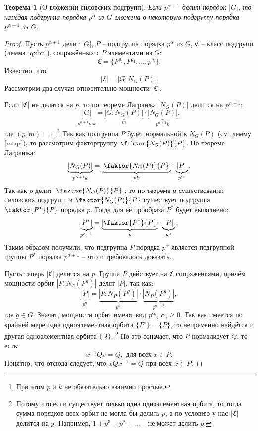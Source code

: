 \documentclass{article}
\newtheorem{theorem}{Теорема}[section]
\begin{document}
\begin{theorem}[О вложении силовских подгрупп]
    Если $p^{\alpha + 1}$ делит порядок $|G|$, то каждая подгруппа порядка $p^\alpha$ из $G$ вложена в некоторую подгруппу порядка $p^{\alpha + 1}$ из $G$.
\end{theorem}
\begin{proof}
    Пусть $p^{\alpha + 1}$ делит $|G|$, $P$ -- подгруппа порядка $p^\alpha$ из $G$, $\mathfrak{C}$ -- класс подгрупп (лемма \ref{qxbn}), сопряжённых с $P$ элементами из $G$: $$ \mathfrak{C} = \{P^{g_1}, P^{g_2}, \ldots, p^{g_s} \}. $$ Известно, что $$|\mathfrak{C}| = | G : N_G(P) |. $$ Рассмотрим два случая относительно мощности $|\mathfrak{C}|$.

    Если $|\mathfrak{C}|$ не делится на $p$, то по теореме Лагранжа $|N_G(P)|$ делится на $p^{\alpha + 1}$: $$ \underbrace{|G|}_{p^{\alpha + 1} m k} = \underbrace{| G : N_G(P) |}_{m} \cdot 
    \underbrace{|N_G(P)|}_{p^{\alpha + 1} k}, $$ где $(p, m) = 1$. \footnote{При этом $p$ и $k$ не обязательно взаимно простые.}
    Так как подгруппа $P$ будет нормальной в $N_G(P)$ (см. лемму \ref{mtqr}), то рассмотрим факторгруппу $\faktor{N_G(P)}{P}$. По теореме Лагранжа: $$ \underbrace{|N_G(P)|}_{p^{\alpha + 1} k} = \underbrace{| \faktor{N_G(P)}{P} |}_{p k} \cdot \underbrace{|P|}_{p^\alpha}. $$ Так как $p$  делит $|\faktor{N_G(P)}{P}|$, то по теореме о существовании силовских подгрупп, в $\faktor{N_G(P)}{P}$ существует подгруппа $\faktor{P^*}{P}$ порядка $p$. Тогда для её прообраза $P^*$ будет выполнено: $$ \underbrace{|P^*|}_{p^{\alpha + 1}} = \underbrace{|\faktor{P^*}{P}|}_{p} \cdot \underbrace{|P|}_{p^\alpha}. $$ Таким образом получили, что подгруппа $P$ порядка $p^\alpha$ является подгруппой группы $P^*$ порядка $p^{\alpha + 1}$ -- что и требовалось доказать.

    Пусть теперь $|\mathfrak{C}|$ делится на $p$. Группа $P$ действует на $\mathfrak{C}$ сопряжениями, причём мощности орбит $|P:N_P(P^g)|$ делят $|P|$, так как: $$ \underbrace{|P|}_{p^\alpha} = \underbrace{|P:N_P(P^g)|}_{p^\beta} \cdot \underbrace{|N_P(P^g)|}_{p^{\alpha - \beta}}, $$ где $g \in G$. Значит, мощности орбит имеют вид $p^{\alpha_i}$, $\alpha_i \geqslant 0$. Так как имеется по крайней мере одна одноэлементная орбита $\{P^e\} = \{P\}$, то непременно найдётся и другая одноэлементная орбита $\{Q\}$.
    \footnote{Потому что если существует только одна одноэлементная орбита, то тогда сумма порядков всех орбит не могла бы делить $p$, а по условию у нас $|\mathfrak{C}|$ делится на $p$. Например, $1 + p^3 + p^8 + \ldots$ -- не может делить $p$.}
    Но это означает, что $P$ нормализует $Q$, то есть: $$ x^{-1} Q x = Q, \text{ для всех } x \in P. $$ Понятно, что отсюда следует, что $xQx^{-1} = Q$ при всех $x \in P$.
    

\end{proof}
\end{document}
